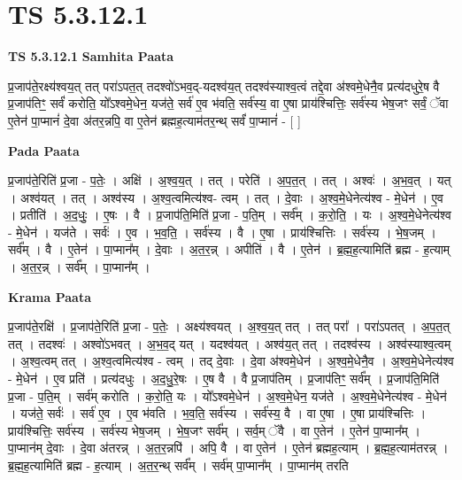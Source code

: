 \documentclass[17pt]{extarticle}
\begin{document}
\section{ TS 5.3.12.1 }

\textbf{TS 5.3.12.1 } \newline
\textbf{Samhita Paata} \newline

प्र॒जाप॑ते॒रक्ष्य॑श्वय॒त् तत् परा॑ऽपत॒त् तदश्वो॑ऽभव॒द्-यदश्व॑य॒त् तदश्व॑स्याश्व॒त्वं तद्दे॒वा अ॑श्वमे॒धेनै॒व प्रत्य॑दधुरे॒ष वै प्र॒जाप॑तिꣳ॒॒ सर्वं॑ करोति॒ यो᳚ऽश्वमे॒धेन॒ यज॑ते॒ सर्व॑ ए॒व भ॑वति॒ सर्व॑स्य॒ वा ए॒षा प्राय॑श्चित्तिः॒ सर्व॑स्य भेष॒जꣳ सर्वं॒ ॅवा ए॒तेन॑ पा॒प्मानं॑ दे॒वा अ॑तर॒न्नपि॒ वा ए॒तेन॑ ब्रह्मह॒त्याम॑तर॒न्थ् सर्वं॑ पा॒प्मानं॑ - [  ] \newline

\textbf{Pada Paata} \newline

प्र॒जाप॑ते॒रिति॑ प्र॒जा - प॒तेः॒ । अक्षि॑ । अ॒श्व॒य॒त् । तत् । परेति॑ । अ॒प॒त॒त् । तत् । अश्वः॑ । अ॒भ॒व॒त् । यत् । अश्व॑यत् । तत् । अश्व॑स्य । अ॒श्व॒त्वमित्य॑श्व- त्वम् । तत् । दे॒वाः । अ॒श्व॒मे॒धेनेत्य॑श्व - मे॒धेन॑ । ए॒व । प्रतीति॑ । अ॒द॒धुः॒ । ए॒षः । वै । प्र॒जाप॑ति॒मिति॑ प्र॒जा - प॒ति॒म् । सर्व᳚म् । क॒रो॒ति॒ । यः । अ॒श्व॒मे॒धेनेत्य॑श्व - मे॒धेन॑ । यज॑ते । सर्वः॑ । ए॒व । भ॒व॒ति॒ । सर्व॑स्य । वै । ए॒षा । प्राय॑श्चित्तिः । सर्व॑स्य । भे॒ष॒जम् । सर्व᳚म् । वै । ए॒तेन॑ । पा॒प्मान᳚म् । दे॒वाः । अ॒त॒र॒न्न् । अपीति॑ । वै । ए॒तेन॑ । ब्र॒ह्म॒ह॒त्यामिति॑ ब्रह्म - ह॒त्याम् । अ॒त॒र॒न्न् । सर्व᳚म् । पा॒प्मान᳚म् ।  \newline


\textbf{Krama Paata} \newline

प्र॒जाप॑ते॒रक्षि॑ । प्र॒जाप॑ते॒रिति॑ प्र॒जा - प॒तेः॒ । अक्ष्य॑श्वयत् । अ॒श्व॒य॒त् तत् । तत् परा᳚ । परा॑ऽपतत् । अ॒प॒त॒त् तत् । तदश्वः॑ । अश्वो॑ऽभवत् । अ॒भ॒व॒द् यत् । यदश्व॑यत् । अश्व॑य॒त् तत् । तदश्व॑स्य । अश्व॑स्याश्व॒त्वम् । अ॒श्व॒त्वम् तत् । अ॒श्व॒त्वमित्य॑श्व - त्वम् । तद् दे॒वाः । दे॒वा अ॑श्वमे॒धेन॑ । अ॒श्व॒मे॒धेनै॒व । अ॒श्व॒मे॒धेनेत्य॑श्व - मे॒धेन॑ । ए॒व प्रति॑ । प्रत्य॑दधुः । अ॒द॒धु॒रे॒षः । ए॒ष वै । वै प्र॒जाप॑तिम् । प्र॒जाप॑तिꣳ॒॒ सर्व᳚म् । प्र॒जाप॑ति॒मिति॑ प्र॒जा - प॒ति॒म् । सर्व॑म् करोति । क॒रो॒ति॒ यः । यो᳚ऽश्वमे॒धेन॑ । अ॒श्व॒मे॒धेन॒ यज॑ते । अ॒श्व॒मे॒धेनेत्य॑श्व - मे॒धेन॑ । यज॑ते॒ सर्वः॑ । सर्व॑ ए॒व । ए॒व भ॑वति । भ॒व॒ति॒ सर्व॑स्य । सर्व॑स्य॒ वै । वा ए॒षा । ए॒षा प्राय॑श्चित्तिः । प्राय॑श्चित्तिः॒ सर्व॑स्य । सर्व॑स्य भेष॒जम् । भे॒ष॒जꣳ सर्व᳚म् । सर्व॒म् ॅवै । वा ए॒तेन॑ । ए॒तेन॑ पा॒प्मान᳚म् । पा॒प्मान॑म् दे॒वाः । दे॒वा अ॑तरन्न् । अ॒त॒र॒न्नपि॑ । अपि॒ वै । वा ए॒तेन॑ । ए॒तेन॑ ब्रह्मह॒त्याम् । ब्र॒ह्म॒ह॒त्याम॑तरन्न् । ब्र॒ह्म॒ह॒त्यामिति॑ ब्रह्म - ह॒त्याम् । अ॒त॒र॒न्थ् सर्व᳚म् । सर्व॑म् पा॒प्मान᳚म् । पा॒प्मान॑म् तरति \newline
\end{document}
